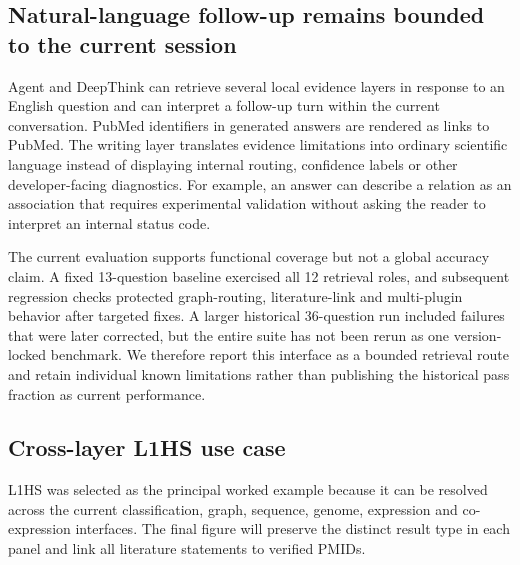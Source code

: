 \subsection{Natural-language follow-up remains bounded to the current session}

Agent and DeepThink can retrieve several local evidence layers in response to an English question and can interpret a follow-up turn within the current conversation. PubMed identifiers in generated answers are rendered as links to PubMed. The writing layer translates evidence limitations into ordinary scientific language instead of displaying internal routing, confidence labels or other developer-facing diagnostics. For example, an answer can describe a relation as an association that requires experimental validation without asking the reader to interpret an internal status code.

The current evaluation supports functional coverage but not a global accuracy claim. A fixed 13-question baseline exercised all 12 retrieval roles, and subsequent regression checks protected graph-routing, literature-link and multi-plugin behavior after targeted fixes. A larger historical 36-question run included failures that were later corrected, but the entire suite has not been rerun as one version-locked benchmark. We therefore report this interface as a bounded retrieval route and retain individual known limitations rather than publishing the historical pass fraction as current performance.

\subsection{Cross-layer L1HS use case}

L1HS was selected as the principal worked example because it can be resolved across the current classification, graph, sequence, genome, expression and co-expression interfaces. The final figure will preserve the distinct result type in each panel and link all literature statements to verified PMIDs. 

